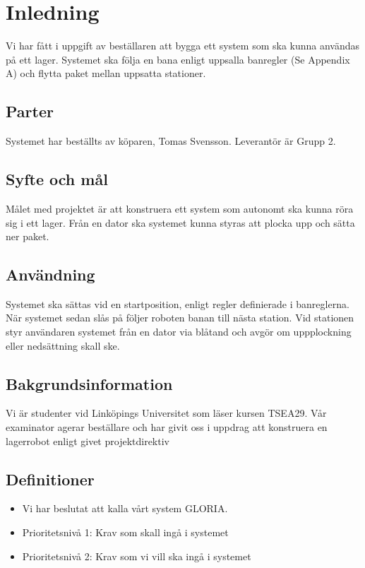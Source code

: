 \section{Inledning}
Vi har fått i uppgift av beställaren att bygga ett system som ska kunna användas på ett lager. Systemet ska följa en bana enligt uppsalla banregler (Se Appendix A) och flytta paket mellan uppsatta stationer.

\begin{LIPSkravlista}
\end{LIPSkravlista}

\subsection{Parter}
Systemet har beställts av köparen, Tomas Svensson. Leverantör är Grupp 2.

\subsection{Syfte och mål}
Målet med projektet är att konstruera ett system som autonomt ska kunna röra sig i ett lager. Från en dator ska systemet kunna styras att plocka upp och sätta ner paket.

\subsection{Användning}
Systemet ska sättas vid en startposition, enligt regler definierade i banreglerna. När systemet sedan slås på följer roboten banan till nästa station. Vid stationen styr användaren systemet från en dator via blåtand och avgör om uppplockning eller nedsättning skall ske.

\subsection{Bakgrundsinformation}
Vi är studenter vid Linköpings Universitet som läser kursen TSEA29. Vår examinator agerar beställare och har givit oss i uppdrag att konstruera en lagerrobot enligt givet projektdirektiv

\subsection{Definitioner}

\begin{itemize}
\item{Vi har beslutat att kalla vårt system GLORIA.}
\item{Prioritetsnivå 1: Krav som skall ingå i systemet}
\item{Prioritetsnivå 2: Krav som vi vill ska ingå i systemet}
\end{itemize}
